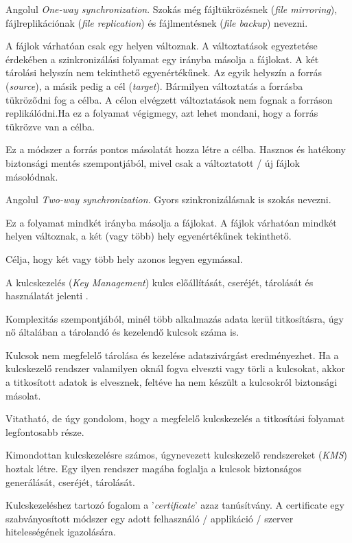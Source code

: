 
Angolul \textit{One-way synchronization}.
Szokás még fájltükrözésnek (\textit{file mirroring}), fájlreplikációnak (\textit{file replication}) és fájlmentésnek (\textit{file backup}) nevezni.

A fájlok várhatóan csak egy helyen változnak. A változtatások egyeztetése érdekében a szinkronizálási folyamat egy irányba másolja a fájlokat. A két tárolási helyszín nem tekinthető egyenértékűnek. Az egyik helyszín a forrás (\textit{source}), a másik pedig a cél (\textit{target}). Bármilyen változtatás a forrásba tükröződni fog a célba. A célon elvégzett változtatások nem fognak a forráson replikálódni.Ha ez a folyamat végigmegy, azt lehet mondani, hogy a forrás tükrözve van a célba.

Ez a módszer a forrás pontos másolatát hozza létre a célba. Hasznos és hatékony biztonsági mentés szempontjából, mivel csak a változtatott / új fájlok másolódnak.


Angolul \textit{Two-way synchronization}.
Gyors szinkronizálásnak is szokás nevezni.

Ez a folyamat mindkét irányba másolja a fájlokat. A fájlok várhatóan mindkét helyen változnak, a két (vagy több) hely egyenértékűnek tekinthető.

Célja, hogy két vagy több hely azonos legyen egymással.

A kulcskezelés (\textit{Key Management}) kulcs előállítását, cseréjét, tárolását és használatát jelenti \cite{rafaeli2003survey}.

Komplexitás szempontjából, minél több alkalmazás adata kerül titkosításra, úgy nő általában a tárolandó és kezelendő kulcsok száma is.

Kulcsok nem megfelelő tárolása és kezelése adatszivárgást eredményezhet. Ha a kulcskezelő rendszer valamilyen oknál fogva elveszti vagy törli a kulcsokat, akkor a titkosított adatok is elvesznek, feltéve ha nem készült a kulcsokról biztonsági másolat.

Vitatható, de úgy gondolom, hogy a megfelelő kulcskezelés a titkosítási folyamat legfontosabb része.

Kimondottan kulcskezelésre számos, úgynevezett kulcskezelő rendszereket (\textit{KMS}) hoztak létre. Egy ilyen rendszer magába foglalja a kulcsok biztonságos generálását, cseréjét, tárolását.

Kulcskezeléshez tartozó fogalom a ’\textit{certificate}’ azaz tanúsítvány. A certificate egy szabványosított módszer egy adott felhasználó / applikáció / szerver hitelességének igazolására.

